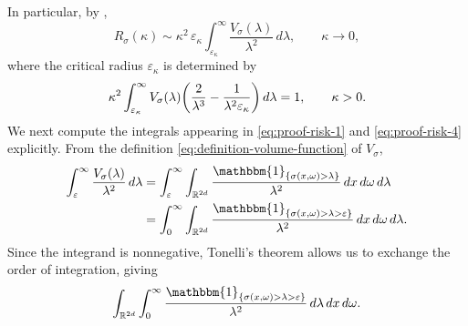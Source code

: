 \documentclass[a4paper,12pt]{article}
\let\originalleft\left
\let\originalright\right
\renewcommand{\left}{\mathopen{}\mathclose\bgroup\originalleft}
\renewcommand{\right}{\aftergroup\egroup\originalright}
\newcommand{\symbolnot}{\sigma}
\begin{document}

In particular, by \cite[Theorem~4]{allard2025metricentropyminimaxrisk},
\begin{equation}\label{eq:proof-risk-1}
R_{\symbolnot}(\kappa)
\sim
\kappa^2\,\varepsilon_\kappa
\int_{\varepsilon_\kappa}^{\infty}\frac{V_{\symbolnot}(\lambda)}{\lambda^2}\,d\lambda,
\qquad \kappa\to0,
\end{equation}
where the critical radius $\varepsilon_\kappa$ is determined by
\begin{equation}\label{eq:proof-risk-4}
\kappa^2
\int_{\varepsilon_\kappa}^{\infty}
V_{\symbolnot}(\lambda)
\left(\frac{2}{\lambda^3}-\frac{1}{\lambda^2\varepsilon_\kappa}\right)
\,d\lambda
=1,
\qquad \kappa>0.
\end{equation}
We next compute the integrals appearing in \eqref{eq:proof-risk-1} and
\eqref{eq:proof-risk-4} explicitly.
From the definition \eqref{eq:definition-volume-function} of $V_{\symbolnot}$,
\begin{align*}
\int_{\varepsilon}^{\infty}\frac{V_{\symbolnot}(\lambda)}{\lambda^2}\,d\lambda
&=
\int_{\varepsilon}^{\infty}
\int_{\mathbb{R}^{2d}}
\frac{\mathbbm{1}_{\{\symbolnot(x,\omega)>\lambda\}}}{\lambda^2}
\,dx\,d\omega\,d\lambda \\
&=
\int_{0}^{\infty}
\int_{\mathbb{R}^{2d}}
\frac{\mathbbm{1}_{\{\symbolnot(x,\omega)>\lambda>\varepsilon\}}}{\lambda^2}
\,dx\,d\omega\,d\lambda .
\end{align*}
Since the integrand is nonnegative, Tonelli’s theorem allows us to exchange the
order of integration, giving
\[
\int_{\mathbb{R}^{2d}}
\int_{0}^{\infty}
\frac{\mathbbm{1}_{\{\symbolnot(x,\omega)>\lambda>\varepsilon\}}}{\lambda^2}
\,d\lambda\,dx\,d\omega .
\]
\end{document}

